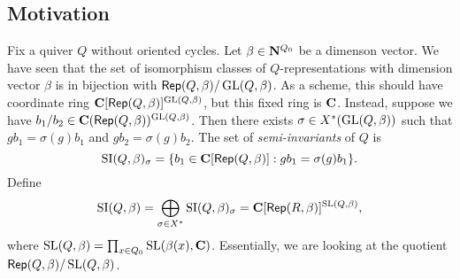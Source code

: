 \documentclass{article}
\begin{document}
\subsection{Motivation}

Fix a quiver $Q$ without oriented cycles. Let $\beta\in \mathbf{N}^{Q_0}$ be a dimenson 
vector. We have seen that the set of isomorphism classes of $Q$-representations 
with dimension vector $\beta$ is in bijection with 
$\operatorname{\mathsf{Rep}}(Q,\beta)/\operatorname{GL}(Q,\beta)$. As a scheme, this should 
have  coordinate ring $\mathbf{C}[\operatorname{\mathsf{Rep}}(Q,\beta)]^{\operatorname{GL}(Q,\beta)}$, 
but this fixed ring is $\mathbf{C}$. Instead, suppose we have 
$b_1/b_2\in \mathbf{C}(\operatorname{\mathsf{Rep}}(Q,\beta))^{\operatorname{GL}(Q,\beta)}$. Then 
there exists $\sigma\in X^\ast(\operatorname{GL}(Q,\beta))$ such that 
$g b_1 = \sigma(g) b_1$ and $g b_2 = \sigma(g) b_2$. The set of 
\emph{semi-invariants} of $Q$ is 
\[
  \operatorname{SI}(Q,\beta)_\sigma = \{b_1\in \mathbf{C}[\operatorname{\mathsf{Rep}}(Q,\beta)]:g b_1 = \sigma(g)b_1\} .
\]
Define 
\[
  \operatorname{SI}(Q,\beta) = \bigoplus_{\sigma\in X^\ast} \operatorname{SI}(Q,\beta)_\sigma = \mathbf{C}[\operatorname{\mathsf{Rep}}(R,\beta)]^{\operatorname{SL}(Q,\beta)} ,
\]
where $\operatorname{SL}(Q,\beta) = \prod_{x\in Q_0} \operatorname{SL}(\beta(x),\mathbf{C})$. 
Essentially, we are looking at the quotient 
$\operatorname{\mathsf{Rep}}(Q,\beta) /\operatorname{SL}(Q,\beta)$. 
\end{document}
